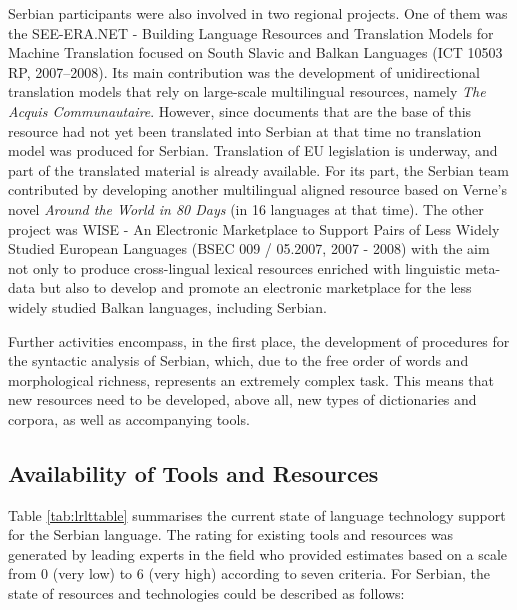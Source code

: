 \begin{multicols}{2}

Serbian participants were also involved in two regional projects. One of them was the SEE-ERA.NET - Building Language Resources and Translation Models for Machine Translation focused on South Slavic and Balkan Languages (ICT 10503 RP, 2007--2008). Its main contribution was the development of unidirectional translation models that rely on large-scale multilingual resources, namely \textit{The Acquis Communautaire}. However, since documents that are the base of this resource had not yet been translated into Serbian at that time no translation model was produced for Serbian. Translation of EU legislation is underway, and part of the translated material is already available. \cite{PREVODJENJE} For its part, the Serbian team contributed by developing another multilingual aligned resource based on Verne’s novel \textit{Around the World in 80 Days} (in 16 languages at that time).  The other project was WISE - An Electronic Marketplace to Support Pairs of Less Widely Studied European Languages (BSEC 009 / 05.2007, 2007 - 2008) with the aim not only to produce cross-lingual lexical resources enriched with linguistic meta-data but also to develop and promote an electronic marketplace for the less widely studied Balkan languages, including Serbian.

Further activities encompass, in the first place, the development of procedures for the syntactic analysis of Serbian, which, due to the free order of words and morphological richness, represents an extremely complex task. This means that new resources need to be developed, above all, new types of dictionaries and corpora, as well as accompanying tools.  


 \subsection {Availability of Tools and Resources}
   
 
Table \ref{tab:lrlttable} summarises the current state of language technology support for the Serbian language. The rating for existing tools and resources was generated by leading experts in the field who provided estimates based on a scale from 0 (very low) to 6 (very high) according to seven criteria.
For Serbian, the state of resources and technologies could be described as follows:


\end{multicols}
